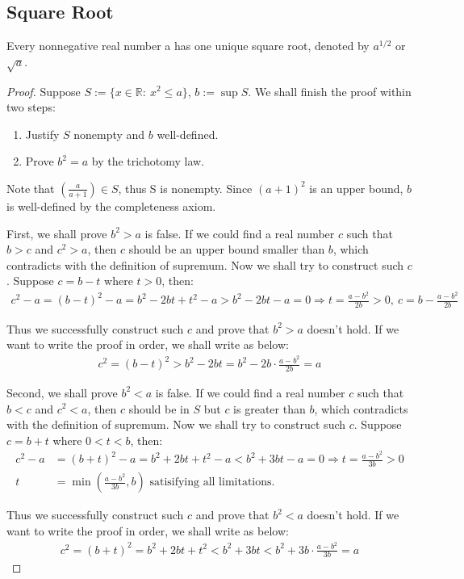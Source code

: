\documentclass[a4paper]{ctexart}
\begin{document}
	\subsection{Square Root}
	\begin{mythm}
		Every nonnegative real number a has one unique square root, denoted by $a^{1/2}$ or $\sqrt a$.
	\end{mythm}
	\begin{proof}
		Suppose $S:=\{x \in \mathbb{R}:\ x^2\le a\}$, $b:=\sup S$. We shall finish the proof within two steps:
		\begin{enumerate}
			\item Justify $S$ nonempty and $b$ well-defined.
			\item Prove $b^2=a$ by the trichotomy law.
		\end{enumerate}
		
		Note that $ \displaystyle \left(\frac{a}{a+1}\right)\in S$, thus S is nonempty. Since $(a+1)^2$ is an upper bound, $b$ is well-defined by the completeness axiom.
		
		First, we shall prove $b^2>a$ is false. If we could find a real number $c$ such that $b>c$ and $c^2>a$, then $c$ should be an upper bound smaller than $b$, which contradicts with the definition of supremum. Now we shall try to construct such $c$. Suppose $c=b-t$ where $t>0$, then:
		\begin{align*}
			c^2-a=(b-t)^2-a
			=b^2-2bt+t^2-a>b^2-2bt-a=0  \Rightarrow t=\frac{a-b^2}{2b}>0,\ c=b-\frac{a-b^2}{2b}
		\end{align*}
		
		Thus we successfully construct such $c$ and prove that $b^2>a$ doesn't hold. If we want to write the proof in order, we shall write as below:
		\begin{align*}
			c^2=(b-t)^2>b^2-2bt=b^2-2b\cdot \frac{a-b^2}{2b}=a
		\end{align*}
		
		Second, we shall prove $b^2<a$ is false. If we could find a real number $c$ such that $b<c$ and $c^2<a$, then $c$ should be in $S$ but $c$ is greater than $b$, which contradicts with the definition of supremum. Now we shall try to construct such $c$. Suppose $c=b+t$ where $0<t<b$, then:
		\begin{align*}
			c^2-a&=(b+t)^2-a
			=b^2+2bt+t^2-a<b^2+3bt-a=0\Rightarrow t=\frac{a-b^2}{3b}>0
			\\ t&=\min\left(\frac{a-b^2}{3b},b\right) \text{ satisifying all limitations.}
		\end{align*}
		
		Thus we successfully construct such $c$ and prove that $b^2<a$ doesn't hold. If we want to write the proof in order, we shall write as below:
		\begin{align*}
			c^2=(b+t)^2=b^2+2bt+t^2<b^2+3bt<b^2+3b\cdot \frac{a-b^2}{3b}=a
		\end{align*}
		
	\end{proof}
\end{document}

